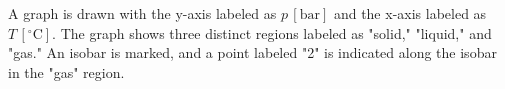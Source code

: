 A graph is drawn with the y-axis labeled as \( p \, [\text{bar}] \) and the x-axis labeled as \( T \, [^\circ \text{C}] \).  
The graph shows three distinct regions labeled as "solid," "liquid," and "gas."  
An isobar is marked, and a point labeled "2" is indicated along the isobar in the "gas" region.